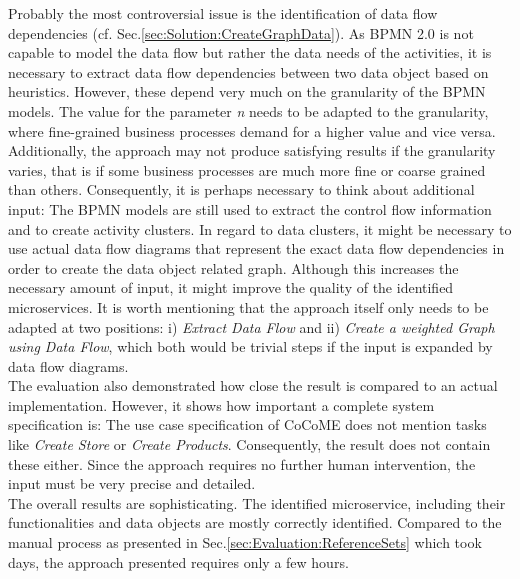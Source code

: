 Probably the most controversial issue is the identification of data flow dependencies (cf. Sec.\ref{sec:Solution:CreateGraphData}). As BPMN 2.0 is not capable to model the data flow but rather the data needs of the activities, it is necessary to extract data flow dependencies between two data object based on heuristics. However, these depend very much on the granularity of the BPMN models. The value for the parameter \textit{n} needs to be adapted to the granularity, where fine-grained business processes demand for a higher value and vice versa. Additionally, the approach may not produce satisfying results if the granularity varies, that is if some business processes are much more fine or coarse grained than others. Consequently, it is perhaps necessary to think about additional input: The BPMN models are still used to extract the control flow information and to create activity clusters. In regard to data clusters, it might be necessary to use actual data flow diagrams that represent the exact data flow dependencies in order to create the data object related graph. Although this increases the necessary amount of input, it might improve the quality of the identified microservices. It is worth mentioning that the approach itself only needs to be adapted at two positions: i) \textit{Extract Data Flow} and ii) \textit{Create a weighted Graph using Data Flow}, which both would be trivial steps if the input is expanded by data flow diagrams. \\
The evaluation also demonstrated how close the result is compared to an actual implementation. However, it shows how important a complete system specification is: The use case specification of CoCoME does not mention tasks like \textit{Create Store} or \textit{Create Products}. Consequently, the result does not contain these either. Since the approach requires no further human intervention, the input must be very precise and detailed.\\
The overall results are sophisticating. The identified microservice, including their functionalities and data objects are mostly correctly identified. Compared to the manual process as presented in Sec.\ref{sec:Evaluation:ReferenceSets} which took days, the approach presented requires only a few hours. 







